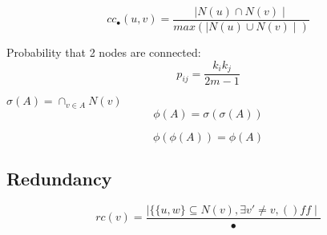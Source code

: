 \documentclass[11pt]{report}
\begin{document}
$$cc_{\bullet}(u,v)=\dfrac{\mid N(u)\cap N(v) \mid}
						  {max(\mid N(u)\cup N(v) \mid)}$$				  


Probability that 2 nodes are connected:
$$p_{ij} = \dfrac{k_{i}k_{j}}{2m-1}$$

$\sigma(A) = \cap_{v\in A} N(v)$
$$\phi(A) = \sigma(\sigma(A))$$

$$\phi(\phi(A)) = \phi(A)$$


\subsection{Redundancy}

$$rc(v)= \dfrac{\mid \{\{u,w\} \subseteq N(v), \exists v' \neq v, ()   ff \mid}{•}$$
\end{document}
